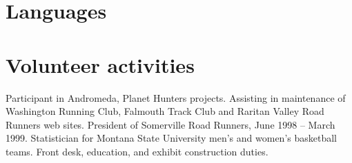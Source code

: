 \documentclass[11pt]{moderncv}  %
\begin{document}
\section{Languages}

\section{Volunteer activities}
  {Participant in Andromeda, Planet Hunters projects.}
  {Assisting in maintenance of Washington Running Club, Falmouth
  Track Club and Raritan Valley Road Runners web sites.
   President of Somerville Road Runners, June 1998 -- March 1999.}
  {Statistician for Montana State University men's and women's basketball
  teams.}
  {Front desk, education, and exhibit construction duties.}
\end{document}
